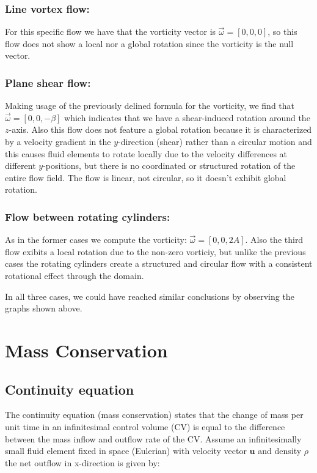 \documentclass{article}
\begin{document}
\subsubsection{Line vortex flow:}
For this specific flow we have that the vorticity vector is $\vec{\omega} = [0, 0, 0]$, so this flow does not show a local nor a global rotation since the vorticity is the null vector.
\subsubsection{Plane shear flow:}
Making usage of the previously delined formula for the vorticity, we find that $\vec{\omega}  = \left[0, 0, -\beta\right]$ which indicates that we have a shear-induced rotation around the $z$-axis. Also this flow does not feature a global rotation because it is characterized by a velocity gradient in the $y$-direction (shear) rather than a circular motion and this causes fluid elements to rotate locally due to the velocity differences at different $y$-positions, but there is no coordinated or structured rotation of the entire flow field. The flow is linear, not circular, so it doesn't exhibit global rotation. 
\subsubsection{Flow between rotating cylinders:}
As in the former cases we compute the vorticity: $\vec{\omega} = [0, 0, 2A]$. Also the third flow exibits a local rotation due to the non-zero vorticiy, but unlike the previous cases the rotating cylinders create a structured and circular flow with a consistent rotational effect through the domain. 

In all three cases, we could have reached similar conclusions by observing the graphs shown above.


\section{Mass Conservation}

\subsection{Continuity equation}
The continuity equation (mass conservation) states that the change of mass per unit time in an infinitesimal control volume (CV) is equal to the difference between the mass inflow and outflow rate of the CV. Assume an infinitesimally small fluid element fixed in space (Eulerian) with velocity vector $\mathbf{u}$ and density $\rho$ the net outflow in x-direction is given by:
\end{document}
